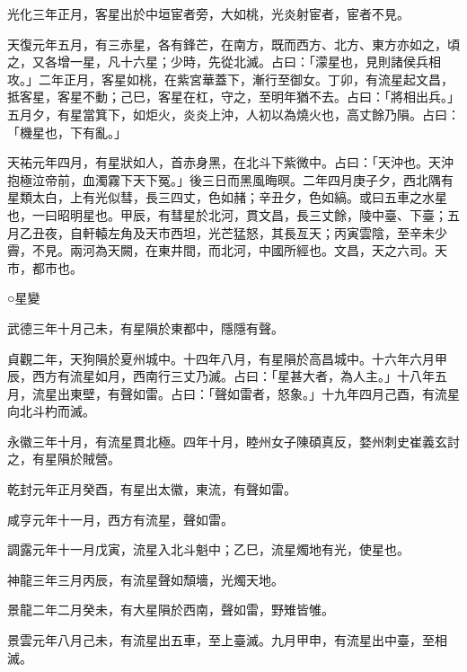 \begin{pinyinscope}
 光化三年正月，客星出於中垣宦者旁，大如桃，光炎射宦者，宦者不見。



 天復元年五月，有三赤星，各有鋒芒，在南方，既而西方、北方、東方亦如之，頃之，又各增一星，凡十六星；少時，先從北滅。占曰：「濛星也，見則諸侯兵相攻。」二年正月，客星如桃，在紫宮華蓋下，漸行至御女。丁卯，有流星起文昌，抵客星，客星不動；己巳，客星在杠，守之，至明年猶不去。占曰：「將相出兵。」五月夕，有星當箕下，如炬火，炎炎上沖，人初以為燒火也，高丈餘乃隕。占曰：「機星也，下有亂。」



 天祐元年四月，有星狀如人，首赤身黑，在北斗下紫微中。占曰：「天沖也。天沖抱極泣帝前，血濁霧下天下冤。」後三日而黑風晦暝。二年四月庚子夕，西北隅有星類太白，上有光似彗，長三四丈，色如赭；辛丑夕，色如縞。或曰五車之水星也，一曰昭明星也。甲辰，有彗星於北河，貫文昌，長三丈餘，陵中臺、下臺；五月乙丑夜，自軒轅左角及天市西坦，光芒猛怒，其長亙天；丙寅雲陰，至辛未少霽，不見。兩河為天闕，在東井間，而北河，中國所經也。文昌，天之六司。天市，都市也。



 ○星變



 武德三年十月己未，有星隕於東都中，隱隱有聲。



 貞觀二年，天狗隕於夏州城中。十四年八月，有星隕於高昌城中。十六年六月甲辰，西方有流星如月，西南行三丈乃滅。占曰：「星甚大者，為人主。」十八年五月，流星出東壁，有聲如雷。占曰：「聲如雷者，怒象。」十九年四月己酉，有流星向北斗杓而滅。



 永徽三年十月，有流星貫北極。四年十月，睦州女子陳碩真反，婺州刺史崔義玄討之，有星隕於賊營。



 乾封元年正月癸酉，有星出太徽，東流，有聲如雷。



 咸亨元年十一月，西方有流星，聲如雷。



 調露元年十一月戊寅，流星入北斗魁中；乙巳，流星燭地有光，使星也。



 神龍三年三月丙辰，有流星聲如頹墻，光燭天地。



 景龍二年二月癸未，有大星隕於西南，聲如雷，野雉皆雊。



 景雲元年八月己未，有流星出五車，至上臺滅。九月甲申，有流星出中臺，至相滅。




\end{pinyinscope}
